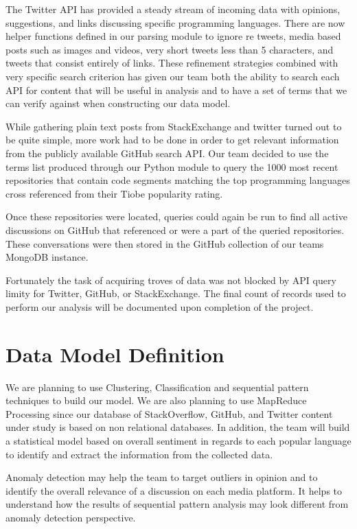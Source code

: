 \documentclass{sig-alternate}
\begin{document}
The Twitter API has provided a steady stream of incoming data with opinions, suggestions, and links discussing specific programming languages. There are now helper functions defined in our parsing module to ignore re tweets, media based posts such as images and videos, very short tweets less than 5 characters, and tweets that consist entirely of links. These refinement strategies combined with very specific search criterion has given our team both the ability to search each API for content that will be useful in analysis and to have a set of terms that we can verify against when constructing our data model.

While gathering plain text posts from StackExchange and twitter turned out to be quite simple, more work had to be done in order to get relevant information from the publicly available GitHub search API. Our team decided to use the terms list produced through our Python module to query the 1000 most recent repositories that contain code segments matching the \textsc{}top\textsc{} programming languages cross referenced from their Tiobe popularity rating.

Once these repositories were located, queries could again be run to find all active discussions on GitHub that referenced or were a part of the queried repositories. These conversations were then stored in the GitHub collection of our team\textsc{}s MongoDB instance.

Fortunately the task of acquiring troves of data was not blocked by API query limity for Twitter, GitHub, or StackExchange. The final count of records used to perform our analysis will be documented upon completion of the project. 

\section{Data Model Definition}
\label{Data Model Definition}

We are planning to use Clustering, Classification and sequential pattern techniques to build our model. We are also planning to use MapReduce Processing since our database of StackOverflow, GitHub, and Twitter content under study is based on non relational databases. In addition, the team will build a statistical model based on overall sentiment in regards to each popular language to identify and extract the information from the collected data. 

Anomaly detection may help the team to target outliers in opinion and to identify the overall relevance of a discussion on each media platform. It helps to understand how the results of sequential pattern analysis may look different from anomaly detection perspective. 
\end{document}
